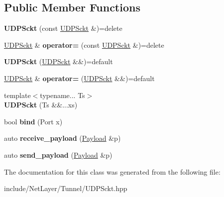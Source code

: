\subsection*{Public Member Functions}
\begin{DoxyCompactItemize}
\item 
\hypertarget{classnl_1_1impl_1_1Tunnel_1_1UDPSckt_a051b9d00d5833099efb0a0b7e0a56d56}{}{\bfseries U\+D\+P\+Sckt} (const \hyperlink{classnl_1_1impl_1_1Tunnel_1_1UDPSckt}{U\+D\+P\+Sckt} \&)=delete\label{classnl_1_1impl_1_1Tunnel_1_1UDPSckt_a051b9d00d5833099efb0a0b7e0a56d56}

\item 
\hypertarget{classnl_1_1impl_1_1Tunnel_1_1UDPSckt_a44b657ca44acf2dd756a7bae3466663a}{}\hyperlink{classnl_1_1impl_1_1Tunnel_1_1UDPSckt}{U\+D\+P\+Sckt} \& {\bfseries operator=} (const \hyperlink{classnl_1_1impl_1_1Tunnel_1_1UDPSckt}{U\+D\+P\+Sckt} \&)=delete\label{classnl_1_1impl_1_1Tunnel_1_1UDPSckt_a44b657ca44acf2dd756a7bae3466663a}

\item 
\hypertarget{classnl_1_1impl_1_1Tunnel_1_1UDPSckt_ae0bd9188147ac27bf69eb97196ed7227}{}{\bfseries U\+D\+P\+Sckt} (\hyperlink{classnl_1_1impl_1_1Tunnel_1_1UDPSckt}{U\+D\+P\+Sckt} \&\&)=default\label{classnl_1_1impl_1_1Tunnel_1_1UDPSckt_ae0bd9188147ac27bf69eb97196ed7227}

\item 
\hypertarget{classnl_1_1impl_1_1Tunnel_1_1UDPSckt_a6be403baed83c611195278f0061d5fc8}{}\hyperlink{classnl_1_1impl_1_1Tunnel_1_1UDPSckt}{U\+D\+P\+Sckt} \& {\bfseries operator=} (\hyperlink{classnl_1_1impl_1_1Tunnel_1_1UDPSckt}{U\+D\+P\+Sckt} \&\&)=default\label{classnl_1_1impl_1_1Tunnel_1_1UDPSckt_a6be403baed83c611195278f0061d5fc8}

\item 
\hypertarget{classnl_1_1impl_1_1Tunnel_1_1UDPSckt_a7cf869256058fe18b96e92605b2b73b0}{}{\footnotesize template$<$typename... Ts$>$ }\\{\bfseries U\+D\+P\+Sckt} (Ts \&\&...xs)\label{classnl_1_1impl_1_1Tunnel_1_1UDPSckt_a7cf869256058fe18b96e92605b2b73b0}

\item 
\hypertarget{classnl_1_1impl_1_1Tunnel_1_1UDPSckt_adb9b8dcfd4cab068d3d8a88009c00546}{}bool {\bfseries bind} (Port x)\label{classnl_1_1impl_1_1Tunnel_1_1UDPSckt_adb9b8dcfd4cab068d3d8a88009c00546}

\item 
\hypertarget{classnl_1_1impl_1_1Tunnel_1_1UDPSckt_af7b8e61ba4fc3e3b0200328677d57c42}{}auto {\bfseries receive\+\_\+payload} (\hyperlink{structnl_1_1Payload}{Payload} \&p)\label{classnl_1_1impl_1_1Tunnel_1_1UDPSckt_af7b8e61ba4fc3e3b0200328677d57c42}

\item 
\hypertarget{classnl_1_1impl_1_1Tunnel_1_1UDPSckt_adf830eb3a290fb5eb3b6e7aabbbe1f44}{}auto {\bfseries send\+\_\+payload} (\hyperlink{structnl_1_1Payload}{Payload} \&p)\label{classnl_1_1impl_1_1Tunnel_1_1UDPSckt_adf830eb3a290fb5eb3b6e7aabbbe1f44}

\end{DoxyCompactItemize}


The documentation for this class was generated from the following file\+:\begin{DoxyCompactItemize}
\item 
include/\+Net\+Layer/\+Tunnel/U\+D\+P\+Sckt.\+hpp\end{DoxyCompactItemize}
